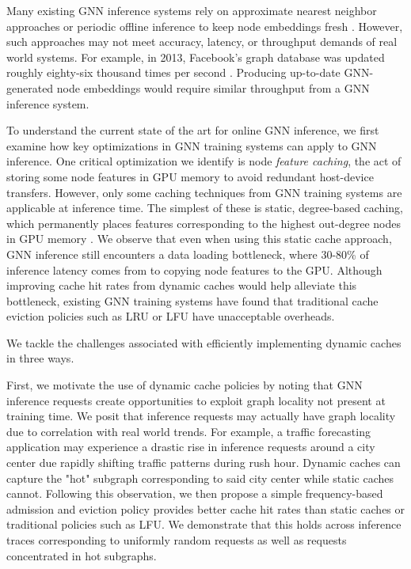 Many existing GNN inference systems rely on approximate nearest neighbor approaches or periodic offline inference to keep node embeddings fresh \cite{Recsys_PinSAGE_2018} \cite{Recsys_Survey_2022}. However, such approaches may not meet accuracy, latency, or throughput demands of real world systems. For example, in 2013, Facebook's graph database was updated roughly eighty-six thousand times per second \cite{Graph_Survey_2020}. Producing up-to-date GNN-generated node embeddings would require similar throughput from a GNN inference system.

To understand the current state of the art for online GNN inference, we first examine how key optimizations in GNN training systems can apply to GNN inference. One critical optimization we identify is node \textit{feature caching}, the act of storing some node features in GPU memory to avoid redundant host-device transfers.
However, only some caching techniques from GNN training systems are applicable at inference time.
The simplest of these is static, degree-based caching, which permanently places features corresponding to the highest out-degree nodes in GPU memory \cite{PaGraph_2020}.
We observe that even when using this static cache approach, GNN inference still encounters a data loading bottleneck, where 30-80\% of inference latency comes from to copying node features to the GPU.
Although improving cache hit rates from dynamic caches would help alleviate this bottleneck, existing GNN training systems have found that traditional cache eviction policies such as LRU or LFU have unacceptable overheads.

We tackle the challenges associated with efficiently implementing dynamic caches in three ways.

First, we motivate the use of dynamic cache policies by noting that GNN inference requests create opportunities to exploit graph locality not present at training time. We posit that inference requests may actually have graph locality due to correlation with real world trends. For example, a traffic forecasting application may experience a drastic rise in inference requests around a city center due rapidly shifting traffic patterns during rush hour. Dynamic caches can capture the "hot" subgraph corresponding to said city center while static caches cannot. Following this observation, we then propose a simple frequency-based admission and eviction policy provides better cache hit rates than static caches or traditional policies such as LFU. We demonstrate that this holds across inference traces corresponding to uniformly random requests as well as requests concentrated in hot subgraphs.


